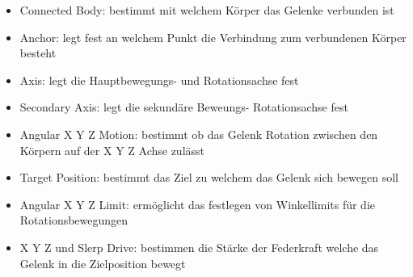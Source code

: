 \begin{itemize}
  \item Connected Body: bestimmt mit welchem Körper das Gelenke verbunden ist
  \item Anchor: legt fest an welchem Punkt die Verbindung zum verbundenen Körper besteht
  \item Axis: legt die Hauptbewegungs- und Rotationsachse fest
  \item Secondary Axis: legt die sekundäre Beweungs- Rotationsachse fest
  \item Angular X Y Z Motion: bestimmt ob das Gelenk Rotation zwischen den Körpern auf der X Y Z Achse zulässt
  \item Target Position: bestimmt das Ziel zu welchem das Gelenk sich bewegen soll
  \item Angular X Y Z Limit: ermöglicht das festlegen von Winkellimits für die Rotationsbewegungen
  \item X Y Z  und Slerp Drive: bestimmen die Stärke der Federkraft welche das Gelenk in die Zielposition bewegt
\end{itemize}